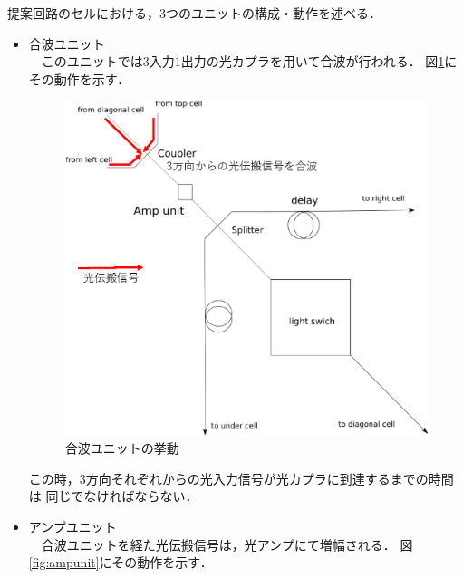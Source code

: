 提案回路のセルにおける，3つのユニットの構成・動作を述べる．
\begin{itemize}
\item 合波ユニット\\
\ \ このユニットでは3入力1出力の光カプラを用いて合波が行われる．
図\ref{fig:couplerunit}にその動作を示す．
\begin{figure}[t!]
\begin{center}
\includegraphics[keepaspectratio,scale=0.4]{fig/3/lightracelogic_cell_6_1.eps}
\caption{合波ユニットの挙動}
\label{fig:couplerunit}
\end{center}
\end{figure}
この時，3方向それぞれからの光入力信号が光カプラに到達するまでの時間は
同じでなければならない．
\item アンプユニット\\
\ \ 合波ユニットを経た光伝搬信号は，光アンプにて増幅される．
図\ref{fig:ampunit}にその動作を示す．
\begin{figure}[t!]
\begin{center}

\end{center}
\end{figure}
\end{itemize}
